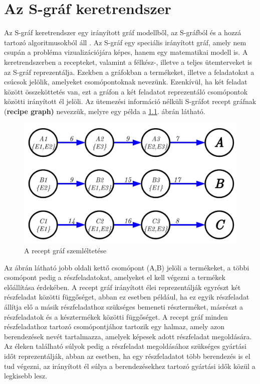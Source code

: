 \chapter{Az S-gráf keretrendszer} \label{S-graph}
Az S-gráf keretrendszer egy irányított gráf modellből, az S-gráfból és a hozzá tartozó algoritmusokból áll \cite{SANMARTI1998S847}. 
Az S-gráf egy speciális irányított gráf, amely nem csupán a probléma vizualizációjára képes, hanem egy matematikai modell is.
A keretrendszerben a recepteket, valamint a félkész-, illetve a teljes ütemterveket is az S-gráf reprezentálja.
Ezekben a gráfokban a termékeket, illetve a feladatokat a csúcsok jelölik, amelyeket csomópontoknak nevezünk.
Ezenkívül, ha két feladat között összeköttetés van, ezt a gráfon a két feladatot reprezentáló csomópontok közötti irányított él jelöli.
Az ütemezési információ nélküli S-gráfot recept gráfnak (\textbf{recipe graph)} nevezzük, melyre egy példa a \ref{recipeGraph}. ábrán látható.
\begin{figure}[H]
\begin{center}
\includegraphics[scale=0.375]{recipeGraph}
\caption{A recept gráf szemléltetése}
\label{recipeGraph}
\end{center}
\end{figure}
Az ábrán látható jobb oldali kettő csomópont (A,B) jelöli a termékeket, a többi csomópont pedig a részfeladatokat, amelyeket el kell végezni a termékek előállítása érdekében.
A recept gráf irányított élei reprezentálják egyrészt két részfeladat közötti függőséget, abban ez esetben például, ha ez egyik részfeladat állítja elő a másik részfeladathoz szükséges bemeneti részterméket, másrészt a részfeladatok és a késztermékek közötti függőséget.
A recept gráf minden részfeladathoz tartozó csomópontjához tartozik egy halmaz, amely azon berendezések nevét tartalmazza, amelyek képesek adott részfeladat megoldására.
Az éleken található súlyok pedig a részfeladat megoldásához szükséges gyártási időt reprezentálják, abban az esetben, ha egy részfeladatot több berendezés is el tud végezni, az irányított él súlya a berendezésekhez tartozó gyártási idők közül a legkisebb lesz.

